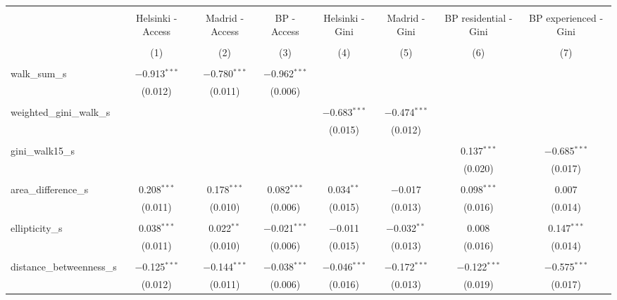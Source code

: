 
\begin{table}[!htbp] \centering 
  \caption{} 
  \label{} 
\begin{tabular}{@{\extracolsep{5pt}}lccccccc} 
\\[-1.8ex]\hline 
\hline \\[-1.8ex] 
 & Helsinki - Access & Madrid - Access & BP - Access & Helsinki - Gini & Madrid - Gini & BP residential - Gini & BP experienced - Gini \\ 
\\[-1.8ex] & (1) & (2) & (3) & (4) & (5) & (6) & (7)\\ 
\hline \\[-1.8ex] 
 walk\_sum\_s & $-$0.913$^{***}$ & $-$0.780$^{***}$ & $-$0.962$^{***}$ &  &  &  &  \\ 
  & (0.012) & (0.011) & (0.006) &  &  &  &  \\ 
  & & & & & & & \\ 
 weighted\_gini\_walk\_s &  &  &  & $-$0.683$^{***}$ & $-$0.474$^{***}$ &  &  \\ 
  &  &  &  & (0.015) & (0.012) &  &  \\ 
  & & & & & & & \\ 
 gini\_walk15\_s &  &  &  &  &  & 0.137$^{***}$ & $-$0.685$^{***}$ \\ 
  &  &  &  &  &  & (0.020) & (0.017) \\ 
  & & & & & & & \\ 
 area\_difference\_s & 0.208$^{***}$ & 0.178$^{***}$ & 0.082$^{***}$ & 0.034$^{**}$ & $-$0.017 & 0.098$^{***}$ & 0.007 \\ 
  & (0.011) & (0.010) & (0.006) & (0.015) & (0.013) & (0.016) & (0.014) \\ 
  & & & & & & & \\ 
 ellipticity\_s & 0.038$^{***}$ & 0.022$^{**}$ & $-$0.021$^{***}$ & $-$0.011 & $-$0.032$^{**}$ & 0.008 & 0.147$^{***}$ \\ 
  & (0.011) & (0.010) & (0.006) & (0.015) & (0.013) & (0.016) & (0.014) \\ 
  & & & & & & & \\ 
 distance\_betweenness\_s & $-$0.125$^{***}$ & $-$0.144$^{***}$ & $-$0.038$^{***}$ & $-$0.046$^{***}$ & $-$0.172$^{***}$ & $-$0.122$^{***}$ & $-$0.575$^{***}$ \\ 
  & (0.012) & (0.011) & (0.006) & (0.016) & (0.013) & (0.019) & (0.017) \\ 

\end{tabular}
\end{table}
